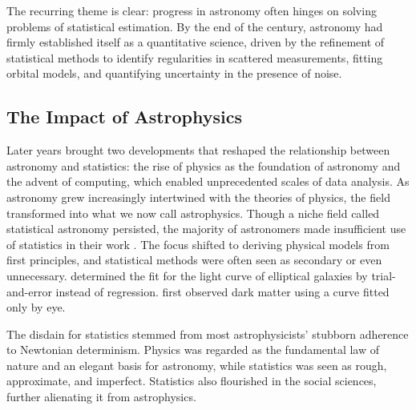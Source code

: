 \documentclass[preprint,longauthor]{aastex631}
\numberwithin{equation}{section}
\begin{document}
The recurring theme is clear: progress in astronomy often hinges on solving problems of statistical estimation. By the end of the century, astronomy had firmly established itself as a quantitative science, driven by the refinement of statistical methods to identify regularities in scattered measurements, fitting orbital models, and quantifying uncertainty in the presence of noise.

\subsection{The Impact of Astrophysics}

Later years brought two developments that reshaped the relationship between astronomy and statistics: the rise of physics as the foundation of astronomy and the advent of computing, which enabled unprecedented scales of data analysis. As astronomy grew increasingly intertwined with the theories of physics, the field transformed into what we now call astrophysics. Though a niche field called statistical astronomy persisted, the majority of astronomers made insufficient use of statistics in their work \citep{feigelsonStatisticalChallengesModern2004}. The focus shifted to deriving physical models from first principles, and statistical methods were often seen as secondary or even unnecessary. \citet{hubbleDistributionLuminosityElliptical1930} determined the fit for the light curve of elliptical galaxies by trial-and-error instead of regression. \citet{zwickyMassesNebulaeClusters1937} first observed dark matter using a curve fitted only by eye.

The disdain for statistics stemmed from most astrophysicists' stubborn adherence to Newtonian determinism. Physics was regarded as the fundamental law of nature and an elegant basis for astronomy, while statistics was seen as rough, approximate, and imperfect. Statistics also flourished in the social sciences, further alienating it from astrophysics.
\end{document}
